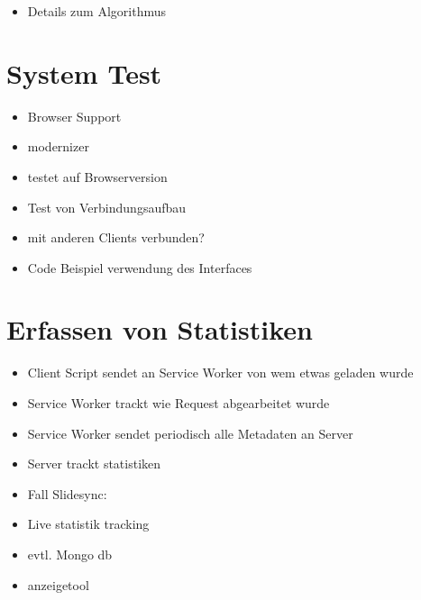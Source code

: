 

\begin{itemize}
	\item Details zum Algorithmus
\end{itemize}
\section{System Test}
\begin{itemize}
	\item Browser Support
	\item 	modernizer
	\item 	testet auf Browserversion
	\item Test von Verbindungsaufbau
	\item 	mit anderen Clients verbunden?
	\item Code Beispiel verwendung des Interfaces
\end{itemize}

\section{Erfassen von Statistiken}
\begin{itemize}
	\item Client Script sendet an Service Worker von wem etwas geladen wurde
	\item Service Worker trackt wie Request abgearbeitet wurde
	\item Service Worker sendet periodisch alle Metadaten an Server
	\item Server trackt statistiken
	\item Fall Slidesync:
	\item 	Live statistik tracking
	\item 	evtl. Mongo db
	\item 	anzeigetool
\end{itemize}

